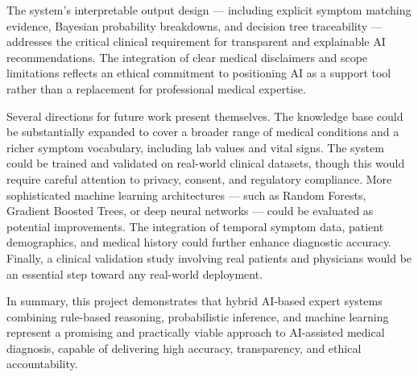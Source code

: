\documentclass[12pt,a4paper]{article}
\begin{document}
The system's interpretable output design --- including explicit symptom matching evidence, Bayesian probability breakdowns, and decision tree traceability --- addresses the critical clinical requirement for transparent and explainable AI recommendations. The integration of clear medical disclaimers and scope limitations reflects an ethical commitment to positioning AI as a support tool rather than a replacement for professional medical expertise.

Several directions for future work present themselves. The knowledge base could be substantially expanded to cover a broader range of medical conditions and a richer symptom vocabulary, including lab values and vital signs. The system could be trained and validated on real-world clinical datasets, though this would require careful attention to privacy, consent, and regulatory compliance. More sophisticated machine learning architectures --- such as Random Forests, Gradient Boosted Trees, or deep neural networks --- could be evaluated as potential improvements. The integration of temporal symptom data, patient demographics, and medical history could further enhance diagnostic accuracy. Finally, a clinical validation study involving real patients and physicians would be an essential step toward any real-world deployment.

In summary, this project demonstrates that hybrid AI-based expert systems combining rule-based reasoning, probabilistic inference, and machine learning represent a promising and practically viable approach to AI-assisted medical diagnosis, capable of delivering high accuracy, transparency, and ethical accountability.
\newpage
\end{document}
